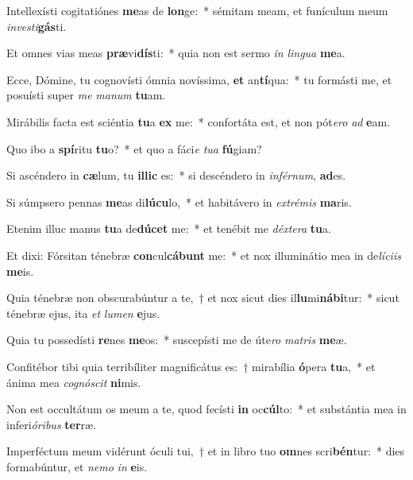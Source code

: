 \item Intellexísti cogitatiónes \textbf{me}as de \textbf{lon}ge:~* sémitam meam, et funículum meum \textit{in}\textit{ves}\textit{ti}\textbf{gás}ti.
\item Et omnes vias meas \textbf{præ}vi\textbf{dís}ti:~* quia non est sermo \textit{in} \textit{lin}\textit{gua} \textbf{me}a.
\item Ecce, Dómine, tu cognovísti ómnia novíssima, \textbf{et} an\textbf{tí}qua:~* tu formásti me, et posuísti super \textit{me} \textit{ma}\textit{num} \textbf{tu}am.
\item Mirábilis facta est sciéntia \textbf{tu}a \textbf{ex} me:~* confortáta est, et non pót\textit{e}\textit{ro} \textit{ad} \textbf{e}am.
\item Quo ibo a \textbf{spí}ritu \textbf{tu}o?~* et quo a fáci\textit{e} \textit{tu}\textit{a} \textbf{fú}giam?
\item Si ascéndero in \textbf{cæ}lum, tu \textbf{il}\textbf{lic} es:~* si descéndero in \textit{in}\textit{fér}\textit{num}, \textbf{ad}es.
\item Si súmpsero pennas \textbf{me}as di\textbf{lú}\textbf{cu}lo,~* et habitávero in \textit{ex}\textit{tré}\textit{mis} \textbf{ma}ris.
\item Etenim illuc manus \textbf{tu}a de\textbf{dú}\textbf{cet} me:~* et tenébit me \textit{déx}\textit{te}\textit{ra} \textbf{tu}a.
\item Et dixi: Fórsitan ténebræ \textbf{con}cul\textbf{cá}\textbf{bunt} me:~* et nox illuminátio mea in de\textit{lí}\textit{ci}\textit{is} \textbf{me}is.
\item Quia ténebræ non obscurabúntur a te,~† et nox sicut dies il\textbf{lu}mi\textbf{ná}\textbf{bi}tur:~* sicut ténebræ ejus, ita \textit{et} \textit{lu}\textit{men} \textbf{e}jus.
\item Quia tu possedísti \textbf{re}nes \textbf{me}os:~* suscepísti me de úte\textit{ro} \textit{ma}\textit{tris} \textbf{me}æ.
\item Confitébor tibi quia terribíliter magnificátus es:~† mirabília \textbf{ó}pera \textbf{tu}a,~* et ánima mea \textit{co}\textit{gnó}\textit{scit} \textbf{ni}mis.
\item Non est occultátum os meum a te, quod fecísti \textbf{in} oc\textbf{cúl}to:~* et substántia mea in inferi\textit{ó}\textit{ri}\textit{bus} \textbf{ter}ræ.
\item Imperféctum meum vidérunt óculi tui,~† et in libro tuo \textbf{om}nes scri\textbf{bén}tur:~* dies formabúntur, et \textit{ne}\textit{mo} \textit{in} \textbf{e}is.
